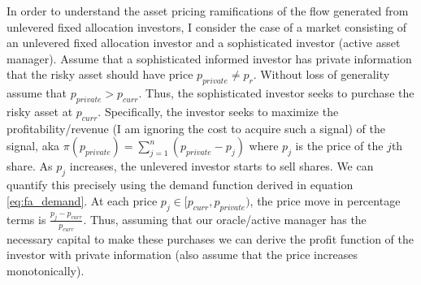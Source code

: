 \documentclass[12pt]{article}
\begin{document}
In order to understand the asset pricing ramifications of the flow generated from unlevered fixed allocation investors, I consider the case of a market consisting of an unlevered fixed allocation investor and a sophisticated investor (active asset manager). Assume that a sophisticated informed investor has private information that the risky asset should have price $p_{private} \neq p_r$. Without loss of generality assume that $p_{private} > p_{curr}$. Thus, the sophisticated investor seeks to purchase the risky asset at $p_{curr}$. Specifically, the investor seeks to maximize the profitability/revenue (I am ignoring the cost to acquire such a signal) of the signal, aka 
\mbox{\(\pi(p_{private}) = \sum_{j=1}^n (p_{private}-p_j)\)}
where $p_j$ is the price of the $j$th share. As $p_j$ increases, the unlevered investor starts to sell shares. We can quantify this precisely using the demand function derived in equation \eqref{eq:fa_demand}. At each price $p_j \in [p_{curr}, p_{private})$, the price move in percentage terms is $\frac{p_j - p_{curr}}{p_{curr}}$. Thus, assuming that our oracle/active manager has the necessary capital to make these purchases we can derive the profit function of the investor with private information (also assume that the price increases monotonically).
\end{document}
